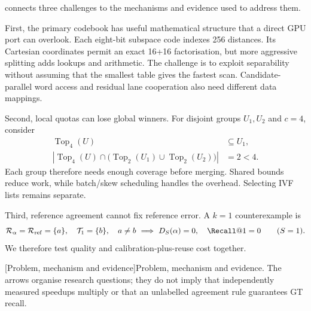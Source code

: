  connects three challenges to the mechanisms and
evidence used to address them.

First, the primary codebook has useful mathematical structure that a direct
GPU port can overlook. Each eight-bit subspace code indexes 256 distances.
Its Cartesian coordinates permit an exact 16+16 factorisation, but more
aggressive splitting adds lookups and arithmetic. The challenge is to exploit
separability without assuming that the smallest table gives the fastest
scan. Candidate-parallel word access and residual lane cooperation also need
different data mappings.

Second, local quotas can lose global winners. For disjoint groups $U_1,U_2$ and $c=4$, consider
\[
 \begin{aligned}
 \operatorname{Top}_4(U)&\subseteq U_1,\\
 \left|\operatorname{Top}_4(U)\cap
 \bigl(\operatorname{Top}_2(U_1)\cup\operatorname{Top}_2(U_2)\bigr)\right|
 &=2<4.
 \end{aligned}
\]
Each group therefore needs enough coverage before merging. Shared bounds reduce work, while batch/skew scheduling handles the overhead. Selecting IVF lists remains separate.

Third, reference agreement cannot fix reference error. A $k=1$ counterexample is
\[
 \mathcal R_\alpha=\mathcal R_{\rm ref}=\{a\},\quad
 \mathcal T_1=\{b\},\quad a\ne b
 \ \Longrightarrow\ 
 D_S(\alpha)=0,\quad \Recall@1=0
 \qquad(S=1).
\]
We therefore test quality and calibration-plus-reuse cost together.

\par\medskip\noindent\begin{minipage}{\linewidth}
\centering\captionsetup{hypcap=false}
\resizebox{\linewidth}{!}{}
[Problem, mechanism and evidence]{Problem, mechanism and evidence. The arrows organise
research questions; they do not imply that independently measured speedups
multiply or that an unlabelled agreement rule guarantees GT recall.}
\label{fig:1-challenges}
\end{minipage}\par\medskip
